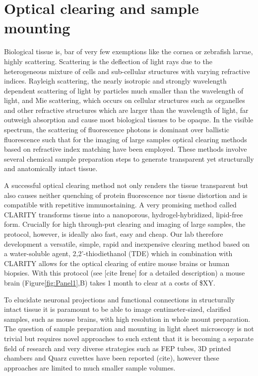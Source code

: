 \documentclass[12pt]{spieman}  %
\begin{document}
\section{Optical clearing and sample mounting}
Biological tissue is, bar of very few exemptions like the cornea or zebrafish larvae, highly scattering. Scattering is the deflection of light rays due to the heterogeneous mixture of cells and sub-cellular structures with varying refractive indices. Rayleigh scattering, the nearly isotropic and strongly wavelength dependent scattering of light by particles much smaller than the wavelength of light, and Mie scattering, which occurs on cellular structures such as organelles and other refractive structures which are larger than the wavelength of light, far outweigh absorption and cause most biological tissues to be opaque. In the visible spectrum, the scattering of fluorescence photons is dominant over ballistic fluorescence such that for the imaging of large samples optical clearing methods based on refractive index matching have been employed. These methods involve several chemical sample preparation steps to generate transparent yet structurally and anatomically intact tissue.

A successful optical clearing method not only renders the tissue transparent but also causes neither quenching of protein fluorescence nor tissue distortion and is compatible with repetitive immunostaining. A very promising method called CLARITY\cite{Chung2013,Tomer2014} transforms tissue into a nanoporous, hydrogel-hybridized, lipid-free form. Crucially for high through-put clearing and imaging of large samples, the protocol, however, is ideally also fast, easy and cheap. Our lab therefore development a versatile, simple, rapid and inexpensive clearing method based on a water-soluble agent, 2,2'-thiodiethanol (TDE) which in combination with CLARITY allows for the optical clearing of entire mouse brains or human biopsies. With this protocol (see [cite Irene] for a detailed description) a mouse brain (Figure\ref{fig:Panel1},B) takes 1 month to clear at a costs of \$XY.
		
To elucidate neuronal projections and functional connections in structurally intact tissue it is paramount to be able to image centimeter-sized, clarified samples, such as mouse brains, with high resolution in whole mount preparation. The question of sample preparation and mounting in light sheet microscopy is not trivial but requires novel approaches to such extent that it is becoming a separate field of research and very diverse strategies such as FEP tubes, 3D printed chambers and Quarz cuvettes have been reported (cite), however these approaches are limited to much smaller sample volumes. 
	
\end{document}

